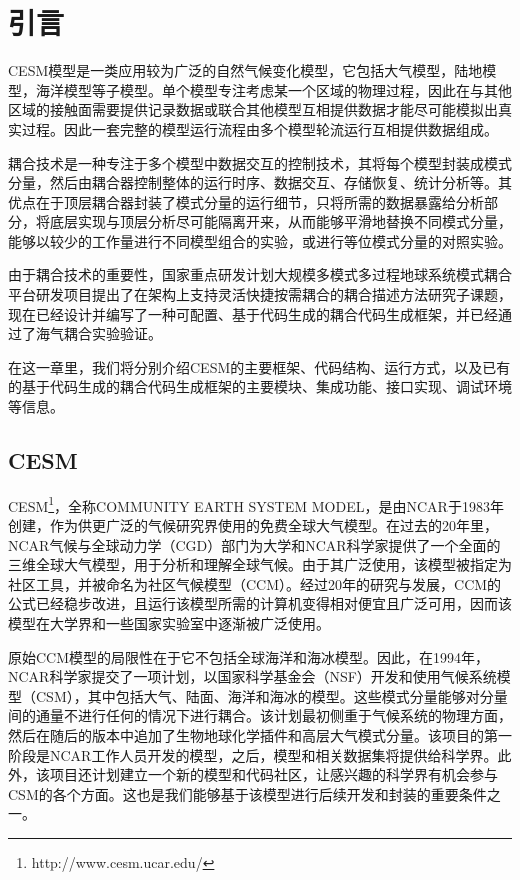 \chapter{引言}
\label{cha:intro}

CESM模型是一类应用较为广泛的自然气候变化模型，它包括大气模型，陆地模型，海洋模型等子模型。单个模型专注考虑某一个区域的物理过程，因此在与其他区域的接触面需要提供记录数据或联合其他模型互相提供数据才能尽可能模拟出真实过程。因此一套完整的模型运行流程由多个模型轮流运行互相提供数据组成。

耦合技术是一种专注于多个模型中数据交互的控制技术，其将每个模型封装成模式分量，然后由耦合器控制整体的运行时序、数据交互、存储恢复、统计分析等。其优点在于顶层耦合器封装了模式分量的运行细节，只将所需的数据暴露给分析部分，将底层实现与顶层分析尽可能隔离开来，从而能够平滑地替换不同模式分量，能够以较少的工作量进行不同模型组合的实验，或进行等位模式分量的对照实验。

由于耦合技术的重要性，国家重点研发计划大规模多模式多过程地球系统模式耦合平台研发项目提出了在架构上支持灵活快捷按需耦合的耦合描述方法研究子课题，现在已经设计并编写了一种可配置、基于代码生成的耦合代码生成框架，并已经通过了海气耦合实验验证。

在这一章里，我们将分别介绍CESM的主要框架、代码结构、运行方式，以及已有的基于代码生成的耦合代码生成框架的主要模块、集成功能、接口实现、调试环境等信息。

\section{CESM}

CESM\texttrademark\footnote{http://www.cesm.ucar.edu/}，全称COMMUNITY EARTH SYSTEM MODEL，是由NCAR于1983年创建，作为供更广泛的气候研究界使用的免费全球大气模型。在过去的20年里，NCAR气候与全球动力学（CGD）部门为大学和NCAR科学家提供了一个全面的三维全球大气模型，用于分析和理解全球气候。由于其广泛使用，该模型被指定为社区工具，并被命名为社区气候模型（CCM）。经过20年的研究与发展，CCM的公式已经稳步改进，且运行该模型所需的计算机变得相对便宜且广泛可用，因而该模型在大学界和一些国家实验室中逐渐被广泛使用。

原始CCM模型的局限性在于它不包括全球海洋和海冰模型。因此，在1994年，NCAR科学家提交了一项计划，以国家科学基金会（NSF）开发和使用气候系统模型（CSM），其中包括大气、陆面、海洋和海冰的模型。这些模式分量能够对分量间的通量不进行任何的情况下进行耦合。该计划最初侧重于气候系统的物理方面，然后在随后的版本中追加了生物地球化学插件和高层大气模式分量。该项目的第一阶段是NCAR工作人员开发的模型，之后，模型和相关数据集将提供给科学界。此外，该项目还计划建立一个新的模型和代码社区，让感兴趣的科学界有机会参与CSM的各个方面。这也是我们能够基于该模型进行后续开发和封装的重要条件之一。


